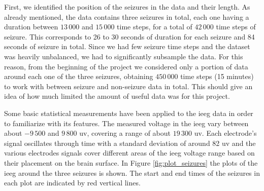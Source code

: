 First, we identified the position of the seizures in the data and their length. As already mentioned, the data contains three seizures in total, each one having a duration between $13\,000$ and $15\,000$ time steps, for a total of $42\,000$ time steps of seizure. This corresponds to 26 to 30 seconds of duration for each seizure and 84 seconds of seizure in total. Since we had few seizure time steps and the dataset was heavily unbalanced, we had to significantly subsample the data. For this reason, from the beginning of the project we considered only a portion of data around each one of the three seizures, obtaining $450\,000$ time steps (15 minutes) to work with between seizure and non-seizure data in total. This should give an idea of how much limited the amount of useful data was for this project.

Some basic statistical measurements have been applied to the \acs{ieeg} data in order to familiarize with its features. The measured voltage in the \acs{ieeg} vary between about $-9\,500$ and $9\,800$ \acs{uv}, covering a range of about $19\,300$ \acs{uv}. Each electrode's signal oscillates through time with a standard deviation of around 82 \acs{uv} and the various electrodes signals cover different areas of the \acs{ieeg} voltage range based on their placement on the brain surface. In Figure \ref{fig:plot_seizures} the plots of the \acs{ieeg} around the three seizures is shown. The start and end times of the seizures in each plot are indicated by red vertical lines.
\newpage
